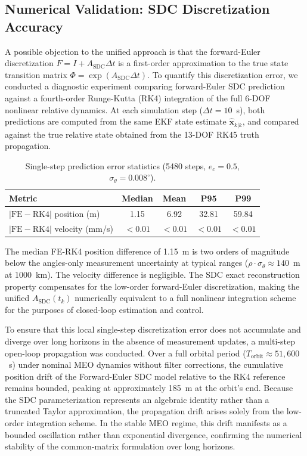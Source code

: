 \documentclass[preprint,3p,times]{elsarticle}
\begin{document}
\subsection{Numerical Validation: SDC Discretization Accuracy}

A possible objection to the unified approach is that the forward-Euler discretization $F = I + A_{\text{SDC}} \Delta t$ is a first-order approximation to the true state transition matrix $\Phi = \exp(A_{\text{SDC}} \Delta t)$. To quantify this discretization error, we conducted a diagnostic experiment comparing forward-Euler SDC prediction against a fourth-order Runge-Kutta (RK4) integration of the full 6-DOF nonlinear relative dynamics. At each simulation step ($\Delta t = 10$~s), both predictions are computed from the same EKF state estimate $\hat{\mathbf{x}}_{k|k}$, and compared against the true relative state obtained from the 13-DOF RK45 truth propagation.

\begin{table}[h]
\centering
\caption{Single-step prediction error statistics (5480 steps, $e_c=0.5$, $\sigma_\theta=0.008^\circ$).}
\label{tab:pred_err}
\begin{tabular}{lcccc}
\toprule
Metric & Median & Mean & P95 & P99 \\
\midrule
$|\text{FE} - \text{RK4}|$ position (m) & 1.15 & 6.92 & 32.81 & 59.84 \\
$|\text{FE} - \text{RK4}|$ velocity (mm/s) & $< 0.01$ & $< 0.01$ & $< 0.01$ & $< 0.01$ \\
\bottomrule
\end{tabular}
\end{table}

The median FE-RK4 position difference of 1.15~m is two orders of magnitude below the angles-only measurement uncertainty at typical ranges ($\rho \cdot \sigma_\theta \approx 140$~m at 1000~km). The velocity difference is negligible. The SDC exact reconstruction property compensates for the low-order forward-Euler discretization, making the unified $A_{\text{SDC}}(t_k)$ numerically equivalent to a full nonlinear integration scheme for the purposes of closed-loop estimation and control.

To ensure that this local single-step discretization error does not accumulate and diverge over long horizons in the absence of measurement updates, a multi-step open-loop propagation was conducted. Over a full orbital period ($T_{\text{orbit}} \approx 51{,}600$~s) under nominal MEO dynamics without filter corrections, the cumulative position drift of the Forward-Euler SDC model relative to the RK4 reference remains bounded, peaking at approximately 185~m at the orbit's end. Because the SDC parameterization represents an algebraic identity rather than a truncated Taylor approximation, the propagation drift arises solely from the low-order integration scheme. In the stable MEO regime, this drift manifests as a bounded oscillation rather than exponential divergence, confirming the numerical stability of the common-matrix formulation over long horizons.
\end{document}
